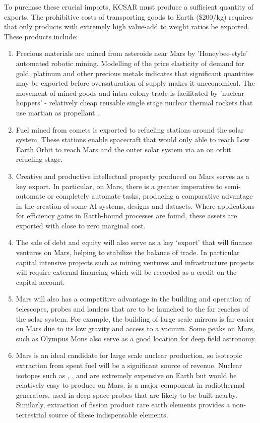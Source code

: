 \documentclass[fleqn,10pt]{Stylesheet} %
\begin{document}
To purchase these crucial imports, KCSAR must produce a sufficient quantity of exports. The prohibitive costs of transporting goods to Earth (\$200/kg) requires that only products with extremely high value-add to weight ratios be exported. These products include:

\begin{enumerate}
\item Precious materials are mined from asteroids near Mars by 'Honeybee-style' automated robotic mining. Modelling of the price elasticity of demand for gold, platinum and other precious metals indicates that significant quantities may be exported before oversaturation of supply makes it uneconomical. The movement of mined goods and intra-colony trade is facilitated by 'nuclear hoppers' - relatively cheap reusable single stage nuclear thermal rockets that use martian  as propellant \cite{ZubriN2011}.
\item Fuel mined from comets is exported to refueling stations around the solar system. These stations enable spacecraft that would only able to reach Low Earth Orbit to reach Mars and the outer solar system via an on orbit refueling stage.
\item Creative and productive intellectual property produced on Mars serves as a key export. In particular, on Mars, there is a greater imperative to semi-automate or completely automate tasks, producing a comparative advantage in the creation of some AI systems, designs and datasets. Where applications for efficiency gains in Earth-bound processes are found, these assets are exported with close to zero marginal cost.
\item  The sale of debt and equity will also serve as a key ‘export’ that will finance ventures on Mars, helping to stabilize the balance of trade. In particular capital intensive projects such as mining ventures and infrastructure projects will require external financing which will be recorded as a credit on the capital account.
\item Mars will also has a competitive advantage in the building and operation of telescopes, probes and landers that are to be launched to the far reaches of the solar system. For example, the building of large scale mirrors is far easier on Mars due to its low gravity and access to a vacuum. Some peaks on Mars, such as Olympus Mons also serve as a good location for deep field astronomy.
\item Mars is an ideal candidate for large scale nuclear production, so isotropic extraction from spent fuel will be a significant source of revenue. Nuclear isotopes such as , ,  and  are extremely expensive on Earth but would be relatively easy to produce on Mars.  is a major component in radiothermal generators, used in deep space probes that are likely to be built nearby. Similarly, extraction of fission product rare earth elements provides a non-terrestrial source of these indispensable elements.

\end{enumerate}
\end{document}
